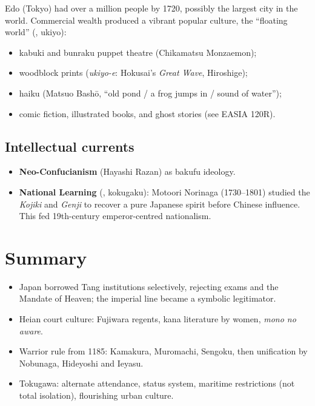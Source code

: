 Edo (Tokyo) had over a million people by 1720, possibly the largest city in the world.
Commercial wealth produced a vibrant popular culture, the ``floating world''
(, ukiyo):

\begin{itemize}
  \item kabuki and bunraku puppet theatre (Chikamatsu Monzaemon);
  \item woodblock prints (\emph{ukiyo-e}: Hokusai's \emph{Great Wave}, Hiroshige);
  \item haiku (Matsuo Bashō, ``old pond / a frog jumps in / sound of water'');
  \item comic fiction, illustrated books, and ghost stories (see EASIA 120R).
\end{itemize}

\subsection{Intellectual currents}

\begin{itemize}
  \item \textbf{Neo-Confucianism} (Hayashi Razan) as bakufu ideology.
  \item \textbf{National Learning} (, kokugaku): Motoori Norinaga (1730--1801)
        studied the \emph{Kojiki} and \emph{Genji} to recover a pure Japanese spirit before
        Chinese influence. This fed 19th-century emperor-centred nationalism.
\end{itemize}

\section*{Summary}
\begin{itemize}
  \item Japan borrowed Tang institutions selectively, rejecting exams and the Mandate of
        Heaven; the imperial line became a symbolic legitimator.
  \item Heian court culture: Fujiwara regents, kana literature by women, \emph{mono no
        aware}.
  \item Warrior rule from 1185: Kamakura, Muromachi, Sengoku, then unification by
        Nobunaga, Hideyoshi and Ieyasu.
  \item Tokugawa: alternate attendance, status system, maritime restrictions (not total
        isolation), flourishing urban culture.
\end{itemize}
